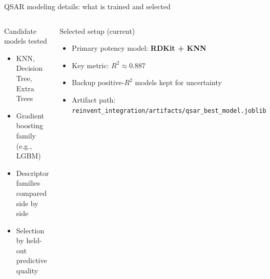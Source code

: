 \documentclass[aspectratio=169,10pt]{beamer}
\begin{document}
\begin{frame}{QSAR modeling details: what is trained and selected}
  \begin{columns}[T]
      \begin{block}{Candidate models tested}
        \begin{itemize}
          \item KNN, Decision Tree, Extra Trees
          \item Gradient boosting family (e.g., LGBM)
          \item Descriptor families compared side by side
          \item Selection by held-out predictive quality
        \end{itemize}
      \end{block}
      \begin{block}{Selected setup (current)}
        \begin{itemize}
          \item Primary potency model: \textbf{RDKit + KNN}
          \item Key metric: \(R^2 \approx 0.887\)
          \item Backup positive-\(R^2\) models kept for uncertainty
          \item Artifact path:\\
            {\scriptsize\texttt{reinvent\_integration/artifacts/qsar\_best\_model.joblib}}
        \end{itemize}
      \end{block}
  \end{columns}
\end{frame}
\end{document}
